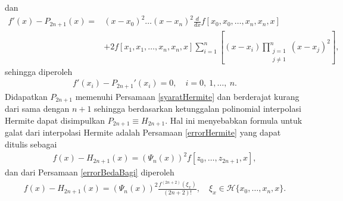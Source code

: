 dan
\begin{align*}
    f'(x) - P_{2n+1}(x) =& (x-x_0)^2\dots(x-x_n)^2\frac{d}{dx}f[x_0,x_0,\dots,x_n,x_n,x] \\
    &+2f[x_1,x_1,\dots,x_n,x_n,x]\sum_{i=1}^n\left[(x-x_i)\prod_{\substack{j=1\\j\neq1}}^n (x-x_j)^2\right],
\end{align*}
sehingga diperoleh
\begin{align*}
    f'(x_i) - P_{2n+1}'(x_i) = 0, \quad i = 0,~1,\dots,~n.
\end{align*}
Didapatkan $P_{2n+1}$ memenuhi Persamaan \eqref{syaratHermite} dan berderajat kurang dari sama dengan $n+1$ sehingga berdasarkan ketunggalan polinomial interpolasi Hermite dapat disimpulkan $P_{2n+1} \equiv H_{2n+1}$. Hal ini menyebabkan formula untuk galat dari interpolasi Hermite adalah Persamaan \eqref{errorHermite} yang dapat ditulis sebagai
\begin{gather*}
     f(x) - H_{2n+1}(x) = (\Psi_n(x))^2f[z_0,\dots,z_{2n+1},x],
\end{gather*}
dan dari Persamaan \eqref{errorBedaBagi} diperoleh
\begin{gather}\label{errorHermite_1}
     f(x) - H_{2n+1}(x) = (\Psi_n(x))^2\frac{f^{(2n+2)}(\xi_x)}{(2n+2)!}, \quad \xi_x \in \mathcal{H}\{x_0,\dots,x_n,x\}.
\end{gather}

